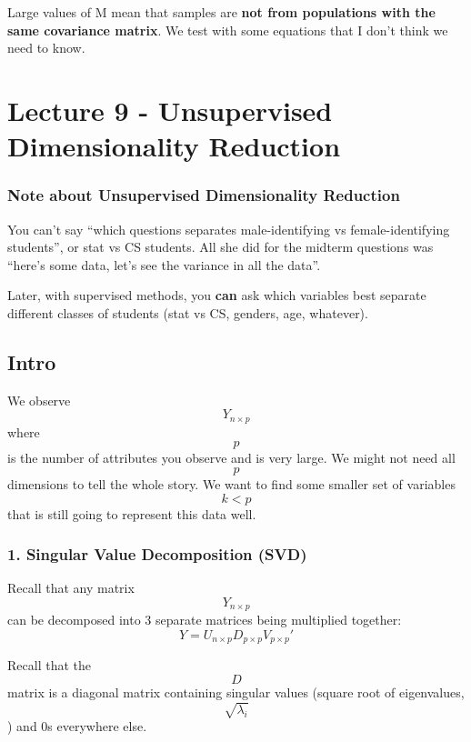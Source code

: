 \documentclass[]{article}
\begin{document}
Large values of M mean that samples are \textbf{not from populations
with the same covariance matrix}. We test with some equations that I
don't think we need to know.

\hypertarget{lecture-9---unsupervised-dimensionality-reduction}{%
\section{Lecture 9 - Unsupervised Dimensionality
Reduction}\label{lecture-9---unsupervised-dimensionality-reduction}}

\hypertarget{note-about-unsupervised-dimensionality-reduction}{%
\subsubsection{Note about Unsupervised Dimensionality
Reduction}\label{note-about-unsupervised-dimensionality-reduction}}

You can't say ``which questions separates male-identifying vs
female-identifying students'', or stat vs CS students. All she did for
the midterm questions was ``here's some data, let's see the variance in
all the data''.

Later, with supervised methods, you \textbf{can} ask which variables
best separate different classes of students (stat vs CS, genders, age,
whatever).

\hypertarget{intro}{%
\subsection{Intro}\label{intro}}

We observe \[Y_{n \times p}\] where \[p\] is the number of attributes
you observe and is very large. We might not need all \[p\] dimensions to
tell the whole story. We want to find some smaller set of variables
\[k < p\] that is still going to represent this data well.

\hypertarget{singular-value-decomposition-svd}{%
\subsubsection{1. Singular Value Decomposition
(SVD)}\label{singular-value-decomposition-svd}}

Recall that any matrix \[Y_{n \times p}\] can be decomposed into 3
separate matrices being multiplied together:
\[Y = U_{n \times p}D_{p \times p}V_{p \times p}'\]

Recall that the \[D\] matrix is a diagonal matrix containing singular
values (square root of eigenvalues, \[\sqrt{\lambda_i}\]) and 0s
everywhere else.
\end{document}
